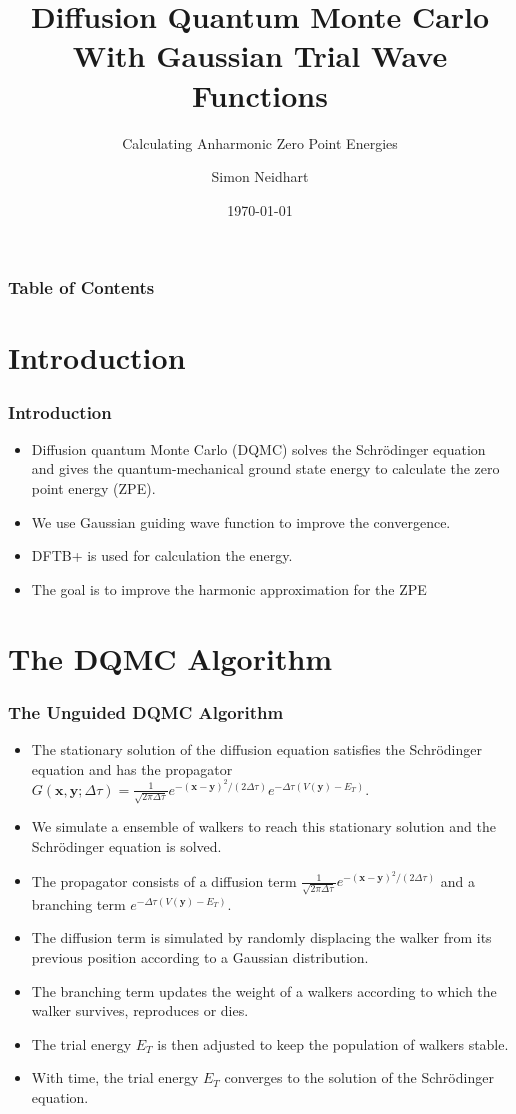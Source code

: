 \documentclass[16pt]{beamer}
\title{Diffusion Quantum Monte Carlo With Gaussian Trial Wave Functions}
\subtitle{Calculating Anharmonic Zero Point Energies}
\author{Simon Neidhart}
\institute{Department of Physics, University of Basel}
\date{\today}
\begin{document}
\frame{\titlepage}

\begin{frame}
\frametitle{Table of Contents}
\tableofcontents
\end{frame}

\section{Introduction}
\begin{frame}
\frametitle{Introduction}
\begin{itemize}
\item Diffusion quantum Monte Carlo (DQMC) solves the Schrödinger equation and gives the quantum-mechanical ground state energy to calculate the zero point energy (ZPE).
\item We use Gaussian guiding wave function to improve the convergence.
\item DFTB+ is used for calculation the energy.
\item The goal is to improve the harmonic approximation for the ZPE
\end{itemize}
\end{frame}

\section{The DQMC Algorithm}
\begin{frame}
\frametitle{The Unguided DQMC Algorithm}
\begin{itemize}
\item The stationary solution of the diffusion equation satisfies the Schrödinger equation and has the propagator $G(\bm{x},\bm{y};\Delta \tau) = \frac{1}{\sqrt{2 \pi \Delta \tau}} e^{-(\bm{x}-\bm{y})^2/(2\Delta \tau)} e^{-\Delta \tau (V(\bm{y}) - E_T)}$.
\item We simulate a ensemble of walkers to reach this stationary solution and the Schrödinger equation is solved.
\item The propagator consists of a diffusion term $\frac{1}{\sqrt{2 \pi \Delta \tau}} e^{-(\bm{x}-\bm{y})^2/(2\Delta \tau)}$ and a branching term $e^{-\Delta \tau (V(\bm{y}) - E_T)}$.
\item The diffusion term is simulated by randomly displacing the walker from its previous position according to a Gaussian distribution.
\item The branching term updates the weight of a walkers according to which the walker survives, reproduces or dies.
\item The trial energy $E_T$ is then adjusted to keep the population of walkers stable.
\item With time, the trial energy $E_T$ converges to the solution of the Schrödinger equation.
\end{itemize}
\end{frame}
\end{document}
